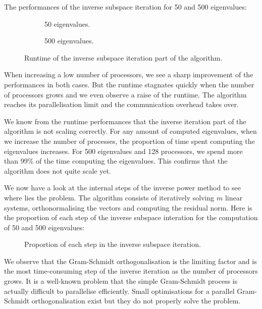 The performances of the inverse subspace iteration for 50 and 500 eigenvalues:

\begin{figure}[H]
  \centering
  \begin{subfigure}[b]{0.5\textwidth}
   
   \caption{50 eigenvalues.}
  \end{subfigure}
  \begin{subfigure}[b]{0.45\textwidth}
   
   \caption{500 eigenvalues.}
  \end{subfigure}
  \caption{Runtime of the inverse subspace iteration part of the algorithm.}
\end{figure}

When increasing a low number of processors, we see a sharp improvement of the performances in both cases.
But the runtime stagnates quickly when the number of processors grows and we even observe a raise of the runtime.
The algorithm reaches its parallelisation limit and the communication overhead takes over.

We know from the runtime performances that the inverse iteration part of the algorithm is not scaling correctly.
For any amount of computed eigenvalues, when we increase the number of processes, the proportion of time spent computing the eigenvalues increases.
For 500 eigenvalues and 128 processors, we spend more than 99\% of the time computing the eigenvalues.
This confirms that the algorithm does not quite scale yet.

We now have a look at the internal steps of the inverse power method to see where lies the problem.
The algorithm consists of iteratively solving \(m\) linear systems, orthonormalising the vectors and computing the residual norm.
Here is the proportion of each step of the inverse subspace interation for the computation of 50 and 500 eigenvalues:

\begin{figure}[H]
  \centering
  
  \caption{Proportion of each step in the inverse subspace iteration.}
\end{figure}

We observe that the Gram-Schmidt orthogonalisation is the limiting factor and is the most time-consuming step of the inverse iteration as the number of processors grows.
It is a well-known problem that the simple Gram-Schmidt process is actually difficult to parallelise efficiently.
Small optimisations for a parallel Gram-Schmidt orthogonalisation exist \cite{katagiri_parallel_gram_schmidt_2003} but they do not properly solve the problem.

